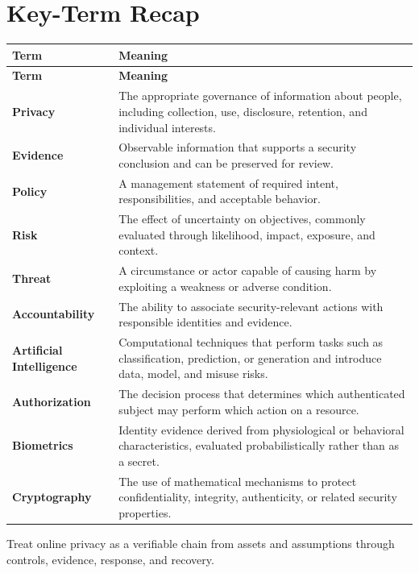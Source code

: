 \documentclass[11pt]{article}
\begin{document}
\section*{Key-Term Recap}
\begin{longtable}{>{\RaggedRight\arraybackslash}p{}>{\RaggedRight\arraybackslash}p{}}
\toprule\rowcolor{Navy}\color{white}\textbf{Term} & \color{white}\textbf{Meaning}\\\midrule
\endfirsthead
\toprule\rowcolor{Navy}\color{white}\textbf{Term} & \color{white}\textbf{Meaning}\\\midrule
\endhead
\textbf{Privacy} & The appropriate governance of information about people, including collection, use, disclosure, retention, and individual interests. \\\midrule
\textbf{Evidence} & Observable information that supports a security conclusion and can be preserved for review. \\\midrule
\textbf{Policy} & A management statement of required intent, responsibilities, and acceptable behavior. \\\midrule
\textbf{Risk} & The effect of uncertainty on objectives, commonly evaluated through likelihood, impact, exposure, and context. \\\midrule
\textbf{Threat} & A circumstance or actor capable of causing harm by exploiting a weakness or adverse condition. \\\midrule
\textbf{Accountability} & The ability to associate security-relevant actions with responsible identities and evidence. \\\midrule
\textbf{Artificial Intelligence} & Computational techniques that perform tasks such as classification, prediction, or generation and introduce data, model, and misuse risks. \\\midrule
\textbf{Authorization} & The decision process that determines which authenticated subject may perform which action on a resource. \\\midrule
\textbf{Biometrics} & Identity evidence derived from physiological or behavioral characteristics, evaluated probabilistically rather than as a secret. \\\midrule
\textbf{Cryptography} & The use of mathematical mechanisms to protect confidentiality, integrity, authenticity, or related security properties. \\\midrule
\bottomrule
\end{longtable}
\begin{takeawaybox}
Treat online privacy as a verifiable chain from assets and assumptions through controls, evidence, response, and recovery.
\end{takeawaybox}
\end{document}
